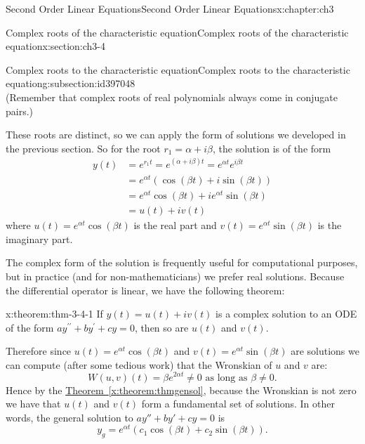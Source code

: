 \documentclass[oneside,10pt,]{book}
\newcommand{\xreffont}{\relax}
\numberwithin{equation}{section}
\numberwithin{equation}{section}
\newcommand{\amp}{&}
\begin{document}
\begin{chapterptx}{Second Order Linear Equations}{}{Second Order Linear Equations}{}{}{x:chapter:ch3}
\begin{sectionptx}{Complex roots of the characteristic equation}{}{Complex roots of the characteristic equation}{}{}{x:section:ch3-4}
\begin{subsectionptx}{Complex roots to the characteristic equation}{}{Complex roots to the characteristic equation}{}{}{g:subsection:id397048}
\begin{equation*}
\end{equation*}
(Remember that complex roots of real polynomials always come in conjugate pairs.)%
\par
These roots are distinct, so we can apply the form of solutions we developed in the previous section. So for the root \(r_1 = \alpha  + i\beta\), the solution is of the form%
\begin{align*}
y(t) \amp =e^{r_1t}=e^{\left(\alpha +i\beta \right)t}=e^{\alpha  t}e^{i\beta t}\\
\amp =e^{\alpha  t}\left(\cos\left(\beta t\right)+i\sin\left(\beta t\right)\right)\\
\amp =e^{\alpha  t}\cos\left(\beta t\right)+ie^{\alpha  t}\sin\left(\beta t\right)\\
\amp =u(t)+iv(t)
\end{align*}
where \(u(t)=e^{\alpha  t}\cos\left(\beta t\right)\) is the real part and \(v(t)=e^{\alpha  t}\sin\left(\beta t\right)\) is the imaginary part.%
\par
The complex form of the solution is frequently useful for computational purposes, but in practice (and for non-mathematicians) we prefer real solutions. Because the differential operator is linear, we have the following theorem:%
\begin{theorem}{}{}{x:theorem:thm-3-4-1}%
If \(y(t)=u(t)+iv(t)\) is a complex solution to an ODE of the form \(ay^{\prime\prime}+by^{\prime}+cy=0\), then so are \(u(t)\) and \(v(t)\).%
\end{theorem}
Therefore since \(u(t)=e^{\alpha  t}\cos\left(\beta t\right)\) and \(v(t)=e^{\alpha  t}\sin\left(\beta t\right)\) are solutions we can compute (after some tedious work) that the Wronskian of \(u\) and \(v\) are:%
\begin{equation*}
W\left(u,v\right)(t)=\beta e^{2\alpha  t}\neq0\text{ as long as }\beta\neq0.
\end{equation*}
Hence by the \hyperref[x:theorem:thmgensol]{Theorem~{\xreffont\ref{x:theorem:thmgensol}}}, because the Wronskian is not zero we have that \(u(t)\) and \(v(t)\) form a fundamental set of solutions. In other words, the general solution to \(a y '' + by' + cy = 0\) is%
\begin{equation*}
y_g = e^{\alpha t} (c_1 \cos(\beta t) + c_2\sin(\beta t)).
\end{equation*}
%
\end{subsectionptx}
%
%
\typeout{************************************************}
\typeout{************************************************}

\end{sectionptx}
\end{chapterptx}
\end{document}
